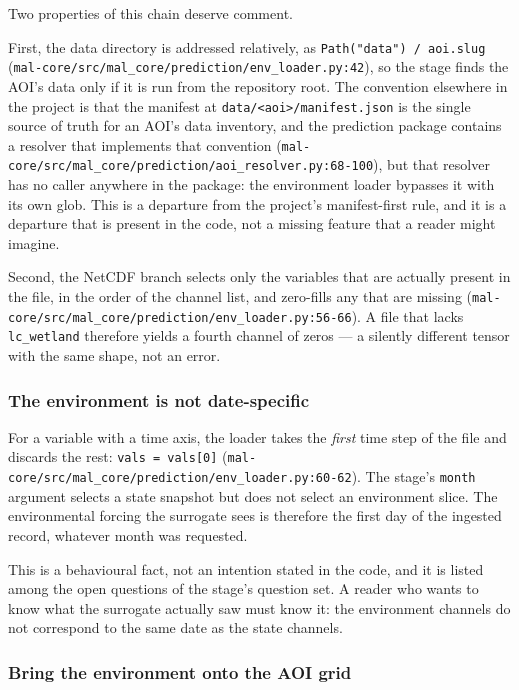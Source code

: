 \documentclass[11pt,a4paper]{article}
\newcommand{\code}[1]{\texttt{#1}}
\begin{document}
Two properties of this chain deserve comment.

First, the data directory is addressed relatively, as
\code{Path("data") / aoi.slug}
(\code{mal-core/src/mal\_core/prediction/env\_loader.py:42}), so the stage
finds the AOI's data only if it is run from the repository root. The
convention elsewhere in the project is that the manifest at
\code{data/<aoi>/manifest.json} is the single source of truth for an AOI's
data inventory, and the prediction package contains a resolver that implements
that convention
(\code{mal-core/src/mal\_core/prediction/aoi\_resolver.py:68-100}), but that
resolver has no caller anywhere in the package: the environment loader
bypasses it with its own glob. This is a departure from the project's
manifest-first rule, and it is a departure that is present in the code, not a
missing feature that a reader might imagine.

Second, the NetCDF branch selects only the variables that are actually
present in the file, in the order of the channel list, and zero-fills any
that are missing
(\code{mal-core/src/mal\_core/prediction/env\_loader.py:56-66}). A file that
lacks \code{lc\_wetland} therefore yields a fourth channel of zeros --- a
silently different tensor with the same shape, not an error.

\subsubsection{The environment is not date-specific}

For a variable with a time axis, the loader takes the \emph{first} time step
of the file and discards the rest: \code{vals = vals[0]}
(\code{mal-core/src/mal\_core/prediction/env\_loader.py:60-62}). The stage's
\code{month} argument selects a state snapshot but does not select an
environment slice. The environmental forcing the surrogate sees is therefore
the first day of the ingested record, whatever month was requested.

This is a behavioural fact, not an intention stated in the code, and it is
listed among the open questions of the stage's question set. A reader who
wants to know what the surrogate actually saw must know it: the environment
channels do not correspond to the same date as the state channels.

\subsubsection{Bring the environment onto the AOI grid}
\end{document}
